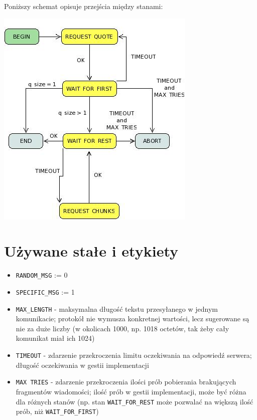 \documentclass[a4paper,11pt,titlepage]{article}
\begin{document}
Poniższy schemat opisuje przejścia między stanami:

\includegraphics{klient}

\section{Używane stałe i etykiety}

\begin{itemize}
\item \texttt{RANDOM\_MSG} := 0
\item \texttt{SPECIFIC\_MSG} := 1
\item \texttt{MAX\_LENGTH} - maksymalna długość tekstu przesyłanego w jednym komunikacie;
protokół nie wymusza konkretnej wartości, lecz sugerowane są nie za duże
liczby (w okolicach 1000, np. 1018 octetów, tak żeby cały komunikat miał
ich 1024)
\item \texttt{TIMEOUT} - zdarzenie przekroczenia limitu oczekiwania na odpowiedź serwera;
długość oczekiwania w gestii implementacji
\item \texttt{MAX TRIES} - zdarzenie przekroczenia ilości prób pobierania brakujących fragmentów wiadomości;
ilość prób w gestii implementacji, może być różna dla różnych stanów (np. stan 
\texttt{WAIT\_FOR\_REST} może pozwalać na większą ilość prób, niż
\texttt{WAIT\_FOR\_FIRST})
\end{itemize}
\end{document}
